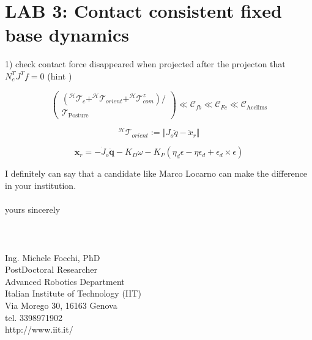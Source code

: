 \documentclass{report}
\begin{document}
\section*{LAB 3: Contact consistent fixed base dynamics}

1) check contact force disappeared when projected after the projecton  that $ N_c^TJ^Tf = 0$ (hint )

\begin{equation}
\left(\begin{array}{c}{\left(^{\mathcal{H}} \mathcal{T}_{c}+^{\mathcal{H}} \mathcal{T}_{orient}
+^{\mathcal{H}} \mathcal{T}_{com}^{z}\right)

 /} \\ {\mathcal{T}_{\text {Posture}}}\end{array}\right) \ll \mathcal{C}_{f b} \ll \mathcal{C}_{F c} \ll \mathcal{C}_{\text {Acclims}}
\end{equation}
 
\begin{equation}
^{\mathcal{H}} \mathcal{T}_{orient} := \Vert J_{o} \ddot{q} - \ddot{x}_r \Vert
\end{equation} 
 
\begin{equation}
\ddot{\mathbf{x}}_{r}=-\dot{J}_{o} \dot{\mathbf{q}}- K_{D} \omega-K_{P}\left(\eta_{d} \epsilon-\eta \epsilon_{d}+\epsilon_{d} \times \epsilon\right)
\end{equation}
 
I definitely can say that a candidate like Marco Locarno can make the difference in your institution. 
\\
\\
yours sincerely\\
\\
\\
\\

Ing. Michele Focchi, PhD\\
PostDoctoral Researcher\\
Advanced Robotics Department\\
Italian Institute of Technology (IIT)\\
Via Morego 30, 16163 Genova\\
tel. 3398971902\\
http://www.iit.it/\\ 

\begin{figure}[!ht]
	\caption{}
	\label{fig:}
\end{figure}


 
\end{document}
